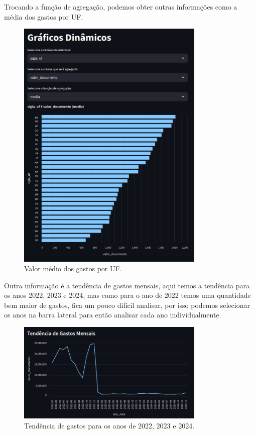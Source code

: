 \documentclass[12pt, a4paper]{article}
\begin{document}
Trocando a função de agregação, podemos obter outras informações como a média dos gastos por UF.

\begin{figure}[!htbp]
	\centering
	\includegraphics[width=0.8\textwidth]{assets/2_plot8.png}
	\caption{Valor médio dos gastos por UF.}
	\label{fig:criacao_postgresql}
\end{figure}

Outra informação é a tendência de gastos mensais, aqui temos a tendência para os anos 2022, 2023 e 2024, mas como para o ano de 2022 temos uma quantidade bem maior de gastos, fica um pouco difícil analisar, por isso podemos selecionar os anos na barra lateral para então analisar cada ano individualmente.

\begin{figure}[!htbp]
	\centering
	\includegraphics[width=0.8\textwidth]{assets/2_plot9.png}
	\caption{Tendência de gastos para os anos de 2022, 2023 e 2024.}
	\label{fig:tendencia de gastos}
\end{figure}
\end{document}
